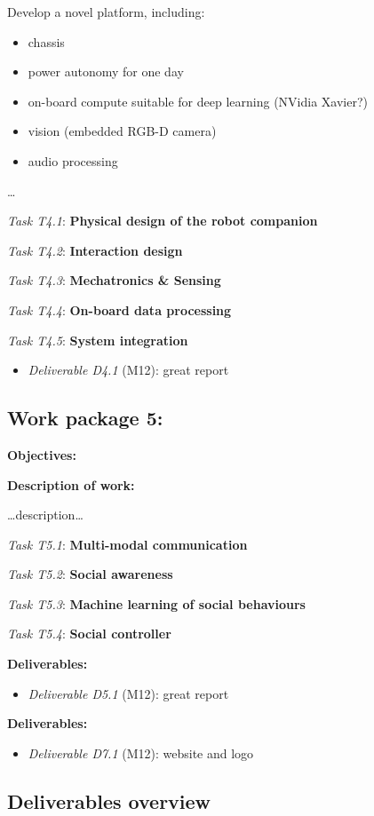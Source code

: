 \documentclass[11pt,a4paper]{report}
\newcommand{\task}[2]{\vspace{0.5cm}\noindent\emph{Task T#1}: {\bf #2}\par}
\newcommand{\D}[3]{\emph{Deliverable D#1} (M#2): #3\\}
\begin{document}
Develop a novel platform, including:

\begin{itemize}
    \item chassis
    \item power autonomy for one day
    \item on-board compute suitable for deep learning (NVidia Xavier?)
    \item vision (embedded RGB-D camera)
    \item audio processing
\end{itemize}

\ldots{}

\task{4.1}{Physical design of the robot companion}
\task{4.2}{Interaction design}
\task{4.3}{Mechatronics \& Sensing}
\task{4.4}{On-board data processing}
\task{4.5}{System integration}

\begin{itemize}
    \item \D{4.1}{12}{great report}
\end{itemize}

\subsection{Work package 5: \wpFive}


\textbf{Objectives:}

\textbf{Description of work:}

\ldots{}description\ldots{}

\task{5.1}{Multi-modal communication}
\task{5.2}{Social awareness}
\task{5.3}{Machine learning of social behaviours}
\task{5.4}{Social controller}

\vspace{0.5cm}\textbf{Deliverables:}

\begin{itemize}
    \item \D{5.1}{12}{great report}
\end{itemize}

\vspace{0.5cm}\textbf{Deliverables:}

\begin{itemize}
    \item \D{7.1}{12}{website and logo}
\end{itemize}


\subsection{Deliverables overview}\label{deliverables-overview}
\end{document}
